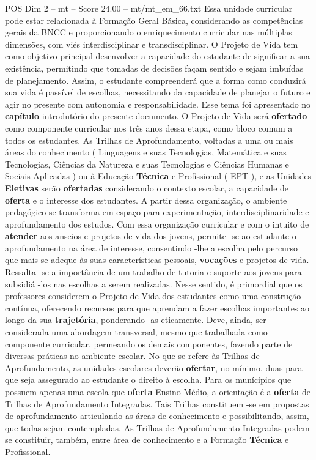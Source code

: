\begin{textsample}{POS Dim 2 – mt – Score 24.00 – mt/mt\_em\_66.txt}
Essa unidade curricular pode estar relacionada à Formação Geral Básica, considerando as competências gerais da BNCC e proporcionando o enriquecimento curricular nas múltiplas dimensões, com viés interdisciplinar e transdisciplinar.
O Projeto de Vida tem como objetivo principal desenvolver a capacidade do estudante de significar a sua existência, permitindo que tomadas de decisões façam sentido e sejam imbuídas de planejamento.
Assim, o estudante compreenderá que a forma como conduzirá sua vida é passível de escolhas, necessitando da capacidade de planejar o futuro e agir no presente com autonomia e responsabilidade.
Esse tema foi apresentado no \textbf{capítulo} introdutório do presente documento.
O Projeto de Vida será \textbf{ofertado} como componente curricular nos três anos dessa etapa, como bloco comum a todos os estudantes.
As Trilhas de Aprofundamento, voltadas a uma ou mais áreas do conhecimento ( Linguagens e suas Tecnologias, Matemática e suas Tecnologias, Ciências da Natureza e suas Tecnologias e Ciências Humanas e Sociais Aplicadas ) ou à Educação \textbf{Técnica} e Profissional ( EPT ), e as Unidades \textbf{Eletivas} serão \textbf{ofertadas} considerando o contexto escolar, a capacidade de \textbf{oferta} e o interesse dos estudantes.
A partir dessa organização, o ambiente pedagógico se transforma em espaço para experimentação, interdisciplinaridade e aprofundamento dos estudos.
Com essa organização curricular e com o intuito de \textbf{atender} aos anseios e projetos de vida dos jovens, permite -se ao estudante o aprofundamento na área de interesse, consentindo -lhe a escolha pelo percurso que mais se adeque às suas características pessoais, \textbf{vocações} e projetos de vida.
Ressalta -se a importância de um trabalho de tutoria e suporte aos jovens para subsidiá -los nas escolhas a serem realizadas.
Nesse sentido, é primordial que os professores considerem o Projeto de Vida dos estudantes como uma construção contínua, oferecendo recursos para que aprendam a fazer escolhas importantes ao longo da sua \textbf{trajetória}, ponderando -as eticamente.
Deve, ainda, ser considerada uma abordagem transversal, mesmo que trabalhada como componente curricular, permeando os demais componentes, fazendo parte de diversas práticas no ambiente escolar.
No que se refere às Trilhas de Aprofundamento, as unidades escolares deverão \textbf{ofertar}, no mínimo, duas para que seja assegurado ao estudante o direito à escolha.
Para os munícipios que possuem apenas uma escola que \textbf{oferta} Ensino Médio, a orientação é a \textbf{oferta} de Trilhas de Aprofundamento Integradas.
Tais Trilhas constituem -se em propostas de aprofundamento articulando as áreas de conhecimento e possibilitando, assim, que todas sejam contempladas.
As Trilhas de Aprofundamento Integradas podem se constituir, também, entre área de conhecimento e a Formação \textbf{Técnica} e Profissional.

\end{textsample}

